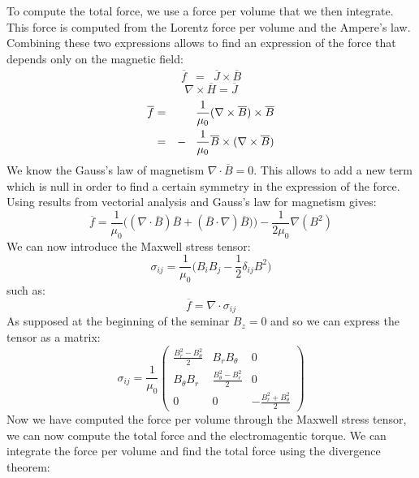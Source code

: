 To compute the total force, we use a force per volume that we then integrate. This force is computed from the Lorentz force per volume and the Ampere's law. Combining these two expressions allows to find an expression of the force that depends only on the magnetic field:
\begin{eqnarray*}
\overline{f} &=&  \overline{J} \times \overline{B}
\end{eqnarray*}
\begin{equation*}
\nabla \times \overline{H} = \overline{J} 
\end{equation*}
\begin{eqnarray*}
\overline{f} &=& \frac{1}{\mu_0} (\nabla \times \overline{B}) \times \overline{B}\\
 &=& -\hspace{3mm}\frac{1}{\mu_0} \overline{B}\times  (\nabla \times \overline{B}) 
\end{eqnarray*}
We know the Gauss's law of magnetism $\nabla \cdot \overline{B} = 0$. This allows to add a new term which is null in order to find a certain symmetry in the expression of the force. Using results from vectorial analysis and Gauss's law for magnetism gives:
\begin{equation*}
\overline{f} = \frac{1}{\mu_0} \Big((\nabla \cdot \overline{B}) \overline{B}   + (\overline{B} \cdot \nabla) \overline{B}  ) \Big) - \frac{1}{2\mu_0} \nabla(B^2)
\end{equation*}
We can now introduce the Maxwell stress tensor:
\begin{equation*}
 \sigma_{ij} = \frac{1}{\mu_0} \Big(B_i B_j - \frac{1}{2} \delta_{ij} B^2 \Big)
\end{equation*}
such as:
\begin{equation*}
\overline{f} = \nabla \cdot \sigma_{ij}
\end{equation*}
As supposed at the beginning of the seminar $ B_z = 0$ and so we can express the tensor as a matrix:
\[ \sigma_{ij} =  \frac{1}{\mu_0}\left( \begin{array}{ccc}
\frac{B_{r}^{2}-B_{\theta}^{2}}{2} & B_{r}B_{\theta}& 0 \\
B_{\theta} B_{r} &  \frac{B_{\theta}^{2}-B_{r}^{2}}{2} &  0 \\
0 & 0  & -\frac{B_{r}^{2}+B_{\theta}^{2}}{2} \end{array} \right) \]
Now we have computed the force per volume through the Maxwell stress tensor, we can now compute the total force and the electromagentic torque. We can integrate the force per volume and find the total force using the divergence theorem:

